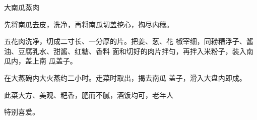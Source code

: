 \begin{recipe}[一品南瓜蒸肉]{大南瓜蒸肉}

\ingredients


\cooking

\step 	先将南瓜去皮，洗净，再将南瓜切盖挖心，掏尽内穰。

\step 	五花肉洗净，切成二寸长、一分厚的片。把姜、葱、花 椒宰细，同耢糟浮子、酱油、豆腐乳水、甜酱、红糖、香料 面和切好的肉片拌匀，再拌入米粉子，装入南瓜内，盖上南 瓜盖子。

\step 	在大蒸碗内大火蒸约二小时。走菜时取出，揭去南瓜 盖子，滑入大盘内即成。

\notes

此菜大方、美观、粑香，肥而不腻，酒饭均可，老年人

特别喜爱。

\end{recipe}


